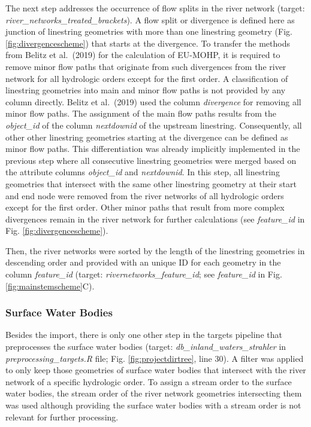 \documentclass[fleqn,10pt]{wlscirep}
\begin{document}
The next step addresses the occurrence of flow splits in the river network (target: \emph{river\_networks\_treated\_brackets}). A flow split or divergence is defined here as junction of linestring geometries with more than one linestring geometry (Fig. \ref{fig:divergencescheme}) that starts at the divergence. To transfer the methods from Belitz et al.~(2019)\cite{belitz_multiorder_2019} for the calculation of EU-MOHP, it is required to remove minor flow paths that originate from such divergences from the river network for all hydrologic orders except for the first order. A classification of linestring geometries into main and minor flow paths is not provided by any column directly. Belitz et al.~(2019)\cite{belitz_multiorder_2019} used the column \emph{divergence} for removing all minor flow paths. The assignment of the main flow paths results from the \emph{object\_id} of the column \emph{nextdownid} of the upstream linestring. Consequently, all other other linestring geometries starting at the divergence can be defined as minor flow paths. This differentiation was already implicitly implemented in the previous step where all consecutive linestring geometries were merged based on the attribute columns \emph{object\_id} and \emph{nextdownid}. In this step, all linestring geometries that intersect with the same other linestring geometry at their start and end node were removed from the river networks of all hydrologic orders except for the first order. Other minor paths that result from more complex divergences remain in the river network for further calculations (see \emph{feature\_id} in Fig. \ref{fig:divergencescheme}).

Then, the river networks were sorted by the length of the linestring geometries in descending order and provided with an unique ID for each geometry in the column \emph{feature\_id} (target: \emph{rivernetworks\_feature\_id}; see \emph{feature\_id} in Fig. \ref{fig:mainstemscheme}C).

\hypertarget{surface-water-bodies}{%
\subsubsection*{Surface Water Bodies}\label{surface-water-bodies}}

Besides the import, there is only one other step in the targets pipeline that preprocesses the surface water bodies (target: \emph{db\_inland\_waters\_strahler} in \emph{preprocessing\_targets.R} file; Fig. \ref{fig:projectdirtree}, line 30). A filter was applied to only keep those geometries of surface water bodies that intersect with the river network of a specific hydrologic order. To assign a stream order to the surface water bodies, the stream order of the river network geometries intersecting them was used although providing the surface water bodies with a stream order is not relevant for further processing.
\end{document}
